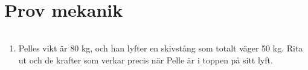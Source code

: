 \documentclass[11pt]{article}
\newcommand{\testName}{Prov mekanik}
\begin{document}
\raggedright
\section*{\testName}
\begin{tabular*}{width}[pos]{cols}
        
\end{tabular*}
\begin{enumerate}
        \item
              \begin{minipage}[t]{0.6\textwidth}
                      Pelles vikt är 80 kg, och han lyfter en skivstång som totalt väger 50 kg. Rita ut och de krafter som verkar precis när Pelle är i toppen på sitt lyft.
              \end{minipage}
              \hspace{2em}
              \begin{adjustbox}{valign=t}
                      
              \end{adjustbox}
\end{enumerate}
\end{document}
